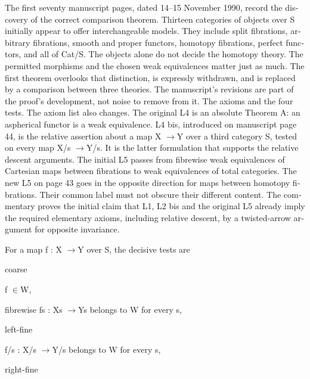 \begin{otherlanguage}{english}
The first seventy manuscript pages, dated 14--15 November 1990, record the discovery of the correct comparison theorem. Thirteen categories of objects over S initially appear to offer interchangeable models. They include split fibrations, arbitrary fibrations, smooth and proper functors, homotopy fibrations, perfect functors, and all of Cat/S. The objects alone do not decide the homotopy theory. The permitted morphisms and the chosen weak equivalences matter just as much. The first theorem overlooks that distinction, is expressly withdrawn, and is replaced by a comparison between three theories. The manuscript’s revisions are part of the proof’s development, not noise to remove from it. The axioms and the four tests. The axiom list also changes. The original L4 is an absolute Theorem A: an aspherical functor is a weak equivalence. L4 bis, introduced on manuscript page 44, is the relative assertion about a map X \ensuremath{\to}Y over a third category S, tested on every map X/s \ensuremath{\to}Y/s. It is the latter formulation that supports the relative descent arguments. The initial L5 passes from fibrewise weak equivalences of Cartesian maps between fibrations to weak equivalences of total categories. The new L5 on page 43 goes in the opposite direction for maps between homotopy fibrations. Their common label must not obscure their different content. The commentary proves the initial claim that L1, L2 bis and the original L5 already imply the required elementary axioms, including relative descent, by a twisted-arrow argument for opposite invariance.


For a map f : X \ensuremath{\to}Y over S, the decisive tests are


coarse


f \ensuremath{\in}W,


fibrewise fs : Xs \ensuremath{\to}Ys belongs to W for every s,


left-fine


f/s : X/s \ensuremath{\to}Y/s belongs to W for every s,


right-fine



\end{otherlanguage}
